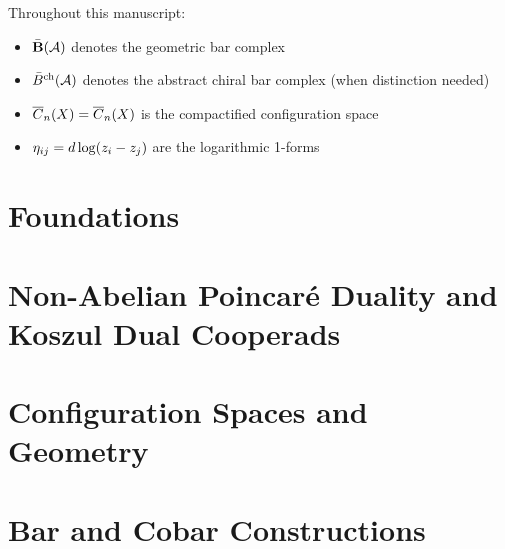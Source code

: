 \documentclass[11pt]{memoir}
\begin{document}
\vspace{1em}

\noindent

\begin{remark}
Throughout this manuscript:
\begin{itemize}
\item $\bar{\mathbf{B}}(\mathcal{A})$ denotes the geometric bar complex
\item $\bar{B}^{\text{ch}}(\mathcal{A})$ denotes the abstract chiral bar complex (when distinction needed)
\item $\overline{C}_{n}(X) = \overline{C}_n(X)$ is the compactified configuration space
\item $\eta_{ij} = d\log(z_i - z_j)$ are the logarithmic 1-forms
\end{itemize}
\end{remark}

\part{Foundations}



%

\part{Non-Abelian Poincaré Duality and Koszul Dual Cooperads}





\part{Configuration Spaces and Geometry}



\part{Bar and Cobar Constructions}
\end{document}
